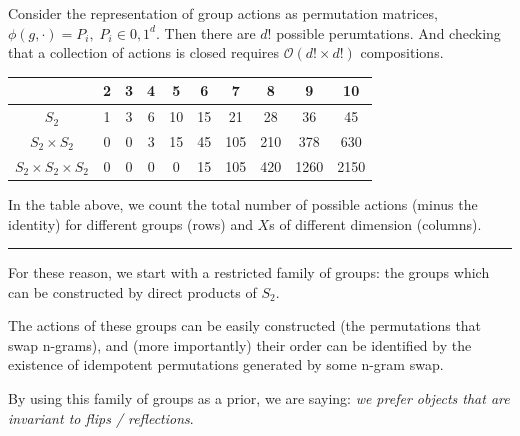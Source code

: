 
Consider the representation of group actions as permutation matrices, $\phi(g, \cdot) = P_i, \; P_i \in {0, 1}^d$.
Then there are $d!$ possible perumtations. And checking that a collection of actions is closed requires $\mathcal O(d! \times d!)$ compositions.\footnotemark[39]


\begin{changemargin}{-3cm}{-3cm}
  \begin{center}
    \begin{tabular}{ c || c | c | c | c | c | c | c | c | c }
											        & 2 & 3 & 4 & 5  & 6   & 7   & 8   & 9 & 10 \\ \hline \hline
											  $S_2$ & 1 & 3 & 6 & 10 & 15  & 21  & 28  & 36   & 45\\ \hline
					   $S_2 \times S_2$ & 0 & 0 & 3 & 15 & 45  & 105 & 210 & 378  & 630 \\ \hline
	$S_2 \times S_2 \times S_2$ & 0 & 0 & 0 & 0  & 15  & 105 & 420 & 1260 & 2150 \\
    \end{tabular}
  \end{center}
\end{changemargin}

In the table above, we count the total number of possible actions (minus the identity) for
different groups (rows) and $X$s of different dimension (columns).

\begin{center}\rule{0.5\linewidth}{\linethickness}\end{center}

For these reason, we start with a restricted family of groups:
the groups which can be constructed by direct products of $S_2$.

The actions of these groups can be easily constructed (the permutations that swap n-grams), and (more importantly)
their order can be identified by the existence of idempotent permutations generated by some n-gram swap.

By using this family of groups as a prior, we are saying: \textit{we prefer objects that are invariant to flips / reflections}.

